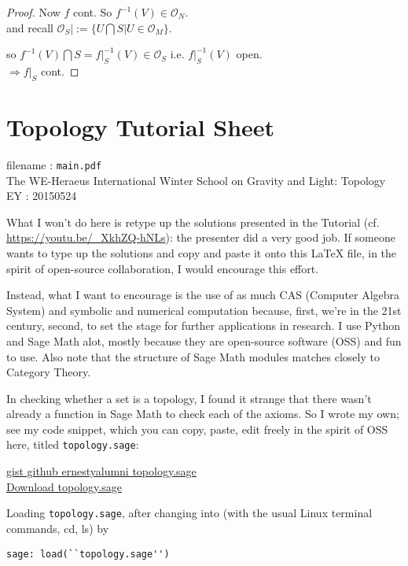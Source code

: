\documentclass[10pt, twoside]{amsart}
\begin{document}
\begin{multicols*}{2}
\begin{proof}
Now $f$ cont. So $f^{-1}(V) \in \mathcal{O}_N$.  \\
and recall $\left. \mathcal{O}_S \right| := \lbrace U \bigcap S | U \in \mathcal{O}_M \rbrace$.  

so $f^{-1}(V) \bigcap S = \left. f \right|_S^{-1}(V) \in \mathcal{O}_S$ i.e. $\left. f\right|_S^{-1}(V)$ open. \\
$\Longrightarrow \left. f\right|_S$ cont.  
\end{proof}

\section*{Topology Tutorial Sheet}
filename : \texttt{main.pdf} \\
The WE-Heraeus International Winter School on Gravity and Light: Topology \\

EY : 20150524  

What I won't do here is retype up the solutions presented in the Tutorial (cf. \url{https://youtu.be/_XkhZQ-hNLs}): the presenter did a very good job.  If someone wants to type up the solutions and copy and paste it onto this LaTeX file, in the spirit of open-source collaboration, I would encourage this effort. 

Instead, what I want to encourage is the use of as much CAS (Computer Algebra System) and symbolic and numerical computation because, first, we're in the 21st century, second, to set the stage for further applications in research.  I use Python and Sage Math alot, mostly because they are open-source software (OSS) and fun to use.  Also note that the structure of Sage Math modules matches closely to Category Theory.  

In checking whether a set is a topology, I found it strange that there wasn't already a function in Sage Math to check each of the axioms.  So I wrote my own; see my code snippet, which you can copy, paste, edit freely in the spirit of OSS here, titled \texttt{topology.sage}: 

\href{https://gist.github.com/ernestyalumni/903eefd01be1f214598b}{gist github ernestyalumni topology.sage} \\
\href{https://gist.githubusercontent.com/ernestyalumni/903eefd01be1f214598b/raw/67083e3b3dec2faf2087713236b413b741bd1180/topology.sage}{Download topology.sage}

Loading \texttt{topology.sage}, after changing into (with the usual Linux terminal commands, cd, ls) by 
\begin{lstlisting}[frame=single]
sage: load(``topology.sage'')
\end{lstlisting}


\end{multicols*}
\end{document}
